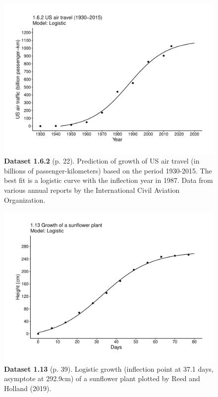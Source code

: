 \documentclass[aps,rmp,preprint,superscriptaddress,10pt,onecolumn]{article}
\begin{document}
\clearpage
\begin{figure}[h]
\includegraphics[width=\textwidth]{output/figs-ggplot/1.6.2.pdf}
\caption*{\textbf{Dataset 1.6.2} (p. 22). Prediction of growth of US air travel (in billions of passenger-kilometers) based on the period 1930-2015. The best fit is a logistic curve with the inflection year in 1987. Data from various annual reports by the International Civil Aviation Organization. }
\end{figure}
	
\clearpage
\begin{figure}[h]
\includegraphics[width=\textwidth]{output/figs-ggplot/1.13.pdf}
\caption*{\textbf{Dataset 1.13} (p. 39). Logistic growth (inflection point at 37.1 days, asymptote at 292.9cm) of a sunflower plant plotted by Reed and Holland (2019). }
\end{figure}
	
\end{document}
